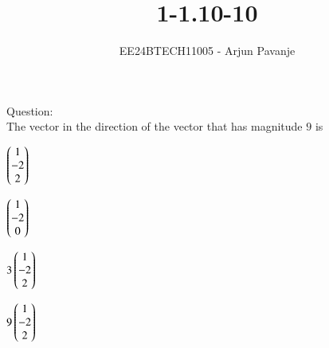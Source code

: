\documentclass[journal]{IEEEtran}
\begin{document}

\vspace{3cm}

\title{1-1.10-10}
\author{EE24BTECH11005 - Arjun Pavanje
}
{\let\newpage\relax\maketitle}
Question:\\
The vector in the direction of the vector  that has magnitude $9$ is
\begin{enumerate}
\begin{multicols}{2}
\item $\begin{pmatrix}1\\-2\\2\end{pmatrix}$
\columnbreak
\item $\begin{pmatrix}1\\-2\\0\end{pmatrix}$
\end{multicols}
\begin{multicols}{2}
	\item $3\begin{pmatrix}1\\-2\\2\end{pmatrix}$
\columnbreak
\item $9\begin{pmatrix}1\\-2\\2\end{pmatrix}$
\end{multicols}
\end{enumerate}
\end{document}
